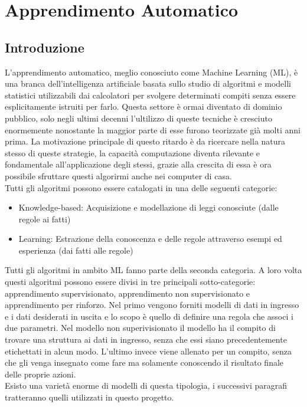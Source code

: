 \documentclass[%
    corpo=12pt,
    twoside,
    oldstyle,
    autoretitolo,
    greek,
    evenboxes,
]{toptesi}
\begin{document}



\chapter{Apprendimento Automatico}
\label{chap:ml}
\section{Introduzione}
L'apprendimento automatico, meglio conosciuto come Machine Learning (ML), è una branca dell'intelligenza artificiale basata sullo studio di algoritmi e modelli statistici utilizzabili dai calcolatori per svolgere determinati compiti senza essere esplicitamente istruiti per farlo. Questa settore è ormai diventato di dominio pubblico, solo negli ultimi decenni l'ultilizzo di queste tecniche è cresciuto enormemente nonostante la maggior parte di esse furono teorizzate già molti anni prima. La motivazione principale di questo ritardo è da ricercare nella natura stesso di queste strategie, la capacità computazione diventa rilevante e fondamentale all'applicazione degli stessi, grazie alla crescita di essa è ora possibile sfruttare questi algorirmi anche nei computer di casa.\\
Tutti gli algoritmi possono essere catalogati in una delle seguenti categorie:
\begin{itemize}
  \item Knowledge-based: Acquisizione e modellazione di leggi conosciute (dalle regole ai fatti)
  \item Learning: Estrazione della conoscenza e delle regole attraverso esempi ed esperienza (dai fatti alle regole)
\end{itemize}
Tutti gli algoritmi in ambito ML fanno parte della seconda categoria. A loro volta questi algoritmi possono essere divisi in tre principali sotto-categorie: apprendimento supervisionato, apprendimento non supervisionato e apprendimento per rinforzo. Nel primo vengono forniti modelli di dati in ingresso e i dati desiderati in uscita e lo scopo è quello di definire una regola che associ i due parametri. Nel modello non superivisionato il modello ha il compito di trovare una struttura ai dati in ingresso, senza che essi siano precedentemente etichettati in alcun modo. L'ultimo invece viene allenato per un compito, senza che gli venga insegnato come fare ma solamente conoscendo il risultato finale delle proprie azioni.\\
Esisto una varietà enorme di modelli di questa tipologia, i successivi paragrafi tratteranno quelli utilizzati in questo progetto.
\end{document}
